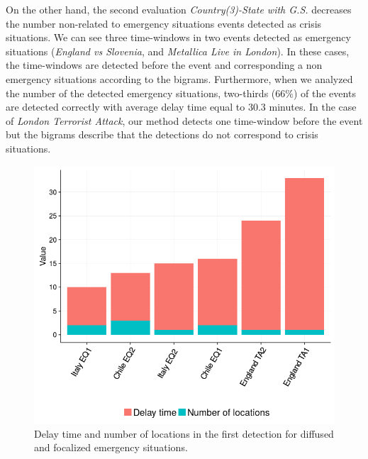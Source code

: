 \documentclass[sigconf]{acmart}
\begin{document}
On the other hand, the second evaluation \textit{Country(3)-State with G.S.} decreases the number non-related to emergency situations events detected as crisis situations. We can see three time-windows in two events detected as emergency situations (\textit{England vs Slovenia}, and \textit{Metallica Live in London}). In these cases, the time-windows are detected before the event and corresponding a non emergency situations according to the bigrams. Furthermore, when we analyzed the number of the detected emergency situations, two-thirds ($66\%$) of the events are detected correctly with average delay time equal to $30.3$ minutes. In the case of \textit{London Terrorist Attack}, our method detects one time-window before the event but the bigrams describe that the detections do not correspond to crisis situations.





\begin{figure}
	\centering
	\includegraphics[width=\columnwidth]{img/delay.png}
	\caption{Delay time and number of locations in the first detection for diffused and focalized emergency situations.}
	\label{fig:delay}
\end{figure}
\end{document}
